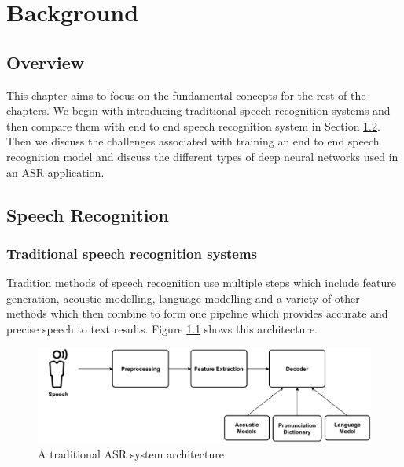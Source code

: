 \chapter{Background}
\label{chapter:background} 

\section{Overview}
This chapter aims to focus on the fundamental concepts for the rest of the chapters. We begin with introducing traditional speech recognition systems and then compare them with end to end speech recognition system in Section \ref{section:asr}. Then we discuss the challenges associated with training an end to end speech recognition model and discuss the different types of deep neural networks used in an ASR application.

\section{Speech Recognition}
\label{section:asr}

\subsection{Traditional speech recognition systems}
\label{section:tradasr}
Tradition methods of speech recognition use multiple steps which include feature generation, acoustic modelling, language modelling and a variety of other methods which then combine to form one pipeline which provides accurate and precise speech to text results. Figure \ref{fig:trad_asr_model} shows this architecture.

\begin{figure}[ht]
  \begin{center}
    \includegraphics[width=\textwidth]{images/Tradition ASR System.pdf} 
    \caption{A traditional ASR system architecture}
    \label{fig:trad_asr_model}
  \end{center}
\end{figure}

